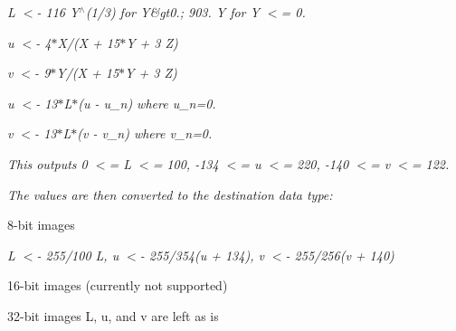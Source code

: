 {\itshape {\itshape }}

{\itshape {\itshape {\itshape L $<$-\/ 116 Y$^\wedge$(1/3) for Y\&gt0.; 903. Y for Y $<$= 0.}}}

{\itshape {\itshape }}

{\itshape {\itshape }}

{\itshape {\itshape {\itshape u\textquotesingle{} $<$-\/ 4$\ast$\+X/(X + 15$\ast$Y + 3 Z)}}}

{\itshape {\itshape }}

{\itshape {\itshape }}

{\itshape {\itshape {\itshape v\textquotesingle{} $<$-\/ 9$\ast$\+Y/(X + 15$\ast$Y + 3 Z)}}}

{\itshape {\itshape }}

{\itshape {\itshape }}

{\itshape {\itshape {\itshape u $<$-\/ 13$\ast$\+L$\ast$(u\textquotesingle{} -\/ u\+\_\+n) where u\+\_\+n=0.}}}

{\itshape {\itshape }}

{\itshape {\itshape }}

{\itshape {\itshape {\itshape v $<$-\/ 13$\ast$\+L$\ast$(v\textquotesingle{} -\/ v\+\_\+n) where v\+\_\+n=0.}}}

{\itshape {\itshape }}

{\itshape {\itshape }}

{\itshape {\itshape This outputs {\itshape 0 $<$= L $<$= 100}, {\itshape -\/134 $<$= u $<$= 220}, {\itshape -\/140 $<$= v $<$= 122}.}}

{\itshape {\itshape }}

{\itshape {\itshape }}

{\itshape {\itshape The values are then converted to the destination data type\+:}}

{\itshape {\itshape  
\begin{DoxyItemize}
\item 8-\/bit images 
\end{DoxyItemize}}}

{\itshape {\itshape }}

{\itshape {\itshape {\itshape L $<$-\/ 255/100 L, u $<$-\/ 255/354(u + 134), v $<$-\/ 255/256(v + 140)}}}

{\itshape {\itshape }}

{\itshape {\itshape 
\begin{DoxyItemize}
\item 16-\/bit images (currently not supported) 
\item 32-\/bit images L, u, and v are left as is 
\end{DoxyItemize}}}

